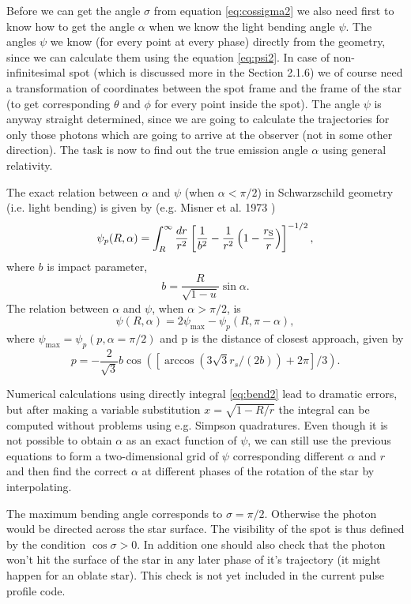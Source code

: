 \documentclass{wihuri}
\def\rg{r_{\rm S}} %
\def\be{\begin{equation}}
\def\ee{\end{equation}}
\def\rg{r_{\rm S}} %
\begin{document}
Before we can get the angle $\sigma$ from equation \ref{eq:cossigma2} we also need first to know how to get the angle $\alpha$ when we know the light bending angle $\psi$. The angles $\psi$ we know (for every point at every phase) directly from the geometry, since we can calculate them using the equation \ref{eq:psi2}. In case of non-infinitesimal spot (which is discussed more in the Section 2.1.6) we of course need a  transformation of coordinates between the spot frame and the frame of the star (to get corresponding $\theta$ and $\phi$ for every point inside the spot). The angle $\psi$ is anyway straight determined, since we are going to calculate the trajectories for only those photons which are going to arrive at the observer (not in some other direction). The task is now to find out the true emission angle $\alpha$ using general relativity. 

The exact relation between $\alpha$ and $\psi$ (when $\alpha < \pi/2$) in Schwarzschild geometry (i.e. light bending) is given by (e.g. Misner et al. 1973 \cite{mtw}) %
\be \label{eq:bend2}
  \psi_{p}(R,\alpha)=\int_R^{\infty} \frac{dr}{r^2} \left[ \frac{1}{b^2} -
       \frac{1}{r^2}\left( 1- \frac{\rg}{r}\right)\right]^{-1/2} ,
\ee
where $b$ is impact parameter,
\be \label{eq:impact2}
  b=\frac{R}{\sqrt{1-u}} \sin\alpha .
\ee
The relation between  $\alpha$ and $\psi$, when $\alpha > \pi/2$, is 
\be 
\psi(R,\alpha)=2\psi_{\max}-\psi_{p}(R,\pi-\alpha),
\ee 
where $\psi_{\max} = \psi_{p}(p,\alpha=\pi/2)$ and p is the distance of closest approach, given by
\be
p = -\frac{2}{\sqrt{3}}b\cos([\arccos(3\sqrt{3}r_{s}/(2b))+2\pi]/3).
\ee


Numerical calculations using directly integral \ref{eq:bend2} lead to dramatic errors, but after making a variable substitution $x = \sqrt{1-R/r}$ the integral can be computed without problems using e.g. Simpson quadratures. Even though it is not possible to obtain $\alpha$ as an exact function of $\psi$, we can still use the previous equations to form a two-dimensional grid of $\psi$ corresponding different $\alpha$ and $r$ and then find the correct $\alpha$ at different phases of the rotation of the star by interpolating. 



The maximum bending angle corresponds to $\sigma=\pi/2$. Otherwise the photon would be directed across the star surface. 
The visibility of the spot is thus defined by the condition $\cos \sigma>0$. In addition one should also check that the photon won't hit the surface of the star in any later phase of it's trajectory (it might happen for an oblate star). This check is not yet included in the current pulse profile code.
\end{document}
